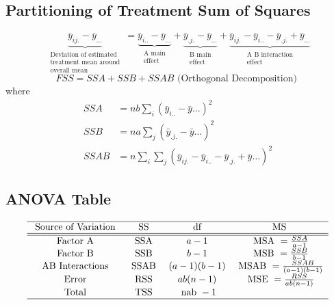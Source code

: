 \documentclass[11pt,a4paper]{article}
\begin{document}
\subsection{Partitioning of Treatment Sum of Squares}
$$\underbrace{\bar{y}_{i j.}-\bar{y}_{...}}_{\begin{array}{c}\text { Deviation of estimated } \\ \text { treatment mean around } \\ \text { overall mean }\end{array}}=\underbrace{\bar{y}_{i . .}-\bar{y}_{...}}_{\begin{array}{c}\text { A main } \\ \text { effect }\end{array}}+\underbrace{\bar{y} _{.j.}-\bar{y}_{...}}_{\begin{array}{c}\text { B main } \\ \text { effect }\end{array}}+\underbrace{\bar{y}_{i j.}-\bar{y}_{i . .}-\bar{y} _{.j.}+\bar{y} _{...}}_{\begin{array}{c}\text { A B interaction } \\ \text { effect }\end{array}}$$
$$
F S S=S S A+S S B+S S A B \text { (Orthogonal Decomposition) }
$$
where
$$
\begin{aligned}
S S A &=n b \sum_{i}\left(\bar{y}_{i . .}-\bar{y} \ldots\right)^{2} \\
S S B &=n a \sum_{j}\left(\bar{y}_{. j .}-\bar{y} \ldots\right)^{2} \\
S S A B &=n \sum_{i} \sum_{j}\left(\bar{y}_{i j .}-\bar{y}_{i . .}-\bar{y}_{. j .}+\bar{y} \ldots\right)^{2}
\end{aligned}
$$

\subsection{ANOVA Table}
\begin{equation}
    \begin{array}{cccc}
    \hline \text { Source of Variation } & \text { SS } & \text { df } & \text { MS } \\
    \hline \hline \text { Factor A } & \text { SSA } & a-1 & \text { MSA }=\frac{S S A}{a-1} \\
    \text { Factor B } & \text { SSB } & b-1 & \text { MSB }=\frac{S S B}{b-1} \\
    \text { AB Interactions } & \text { SSAB } & (a-1)(b-1) & \text { MSAB }=\frac{S S A B}{(a-1)(b-1)} \\
    \text { Error } & \text { RSS } & a b(n-1) & \text { MSE }=\frac{R S S}{a b(n-1)} \\
    \text { Total } & \text { TSS } & \text { nab }-1 & \\
    \hline
    \end{array}
    \nonumber
\end{equation}
\end{document}

